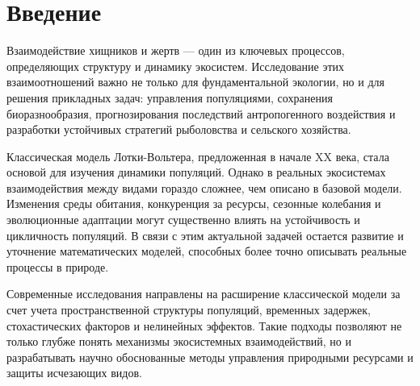 \section{Введение}
Взаимодействие хищников и жертв — один из ключевых процессов, определяющих структуру и динамику экосистем. Исследование этих взаимоотношений важно не только для фундаментальной экологии, но и для решения прикладных задач: управления популяциями, сохранения биоразнообразия, прогнозирования последствий антропогенного воздействия и разработки устойчивых стратегий рыболовства и сельского хозяйства.

Классическая модель Лотки-Вольтера, предложенная в начале XX века, стала основой для изучения динамики популяций. Однако в реальных экосистемах взаимодействия между видами гораздо сложнее, чем описано в базовой модели. Изменения среды обитания, конкуренция за ресурсы, сезонные колебания и эволюционные адаптации могут существенно влиять на устойчивость и цикличность популяций. В связи с этим актуальной задачей остается развитие и уточнение математических моделей, способных более точно описывать реальные процессы в природе.

Современные исследования направлены на расширение классической модели за счет учета пространственной структуры популяций, временных задержек, стохастических факторов и нелинейных эффектов. Такие подходы позволяют не только глубже понять механизмы экосистемных взаимодействий, но и разрабатывать научно обоснованные методы управления природными ресурсами и защиты исчезающих видов.